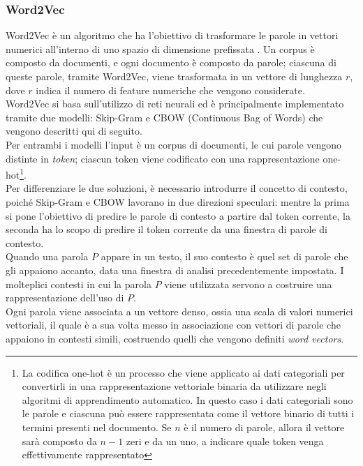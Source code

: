 \documentclass[12pt]{report}
\theoremstyle{definition}
\begin{document}
\subsubsection{Word2Vec} \label{w2v}
Word2Vec è un algoritmo che ha l'obiettivo di trasformare le parole in vettori numerici all'interno di uno spazio  di dimensione prefissata \cite{3}.
Un corpus è composto da documenti, e ogni documento è composto da parole; ciascuna di queste parole, tramite Word2Vec, viene trasformata in un vettore di lunghezza $r$, dove $r$ indica il numero di feature numeriche che vengono considerate. 
\\
Word2Vec si basa sull'utilizzo di reti neurali \cite{3} ed è principalmente implementato tramite due modelli: Skip-Gram e CBOW (Continuous Bag of Words) che vengono descritti qui di seguito.
\\
Per entrambi i modelli l'input è un corpus di documenti, le cui parole vengono distinte in \textit{token}; ciascun token viene codificato con una rappresentazione one-hot\footnote{La codifica one-hot è un processo che viene applicato ai dati categoriali per convertirli in una rappresentazione vettoriale binaria da utilizzare negli algoritmi di apprendimento automatico. In questo caso i dati categoriali sono le parole e ciascuna può essere rappresentata come il vettore binario di tutti i termini presenti nel documento. Se $n$ è il numero di parole, allora il vettore sarà composto da $n-1$ zeri e da un uno, a indicare quale token venga effettivamente rappresentato}.
\\
Per differenziare le due soluzioni, è necessario introdurre il concetto di contesto, poiché Skip-Gram e CBOW lavorano in due direzioni speculari:
mentre la prima si pone l'obiettivo di predire le parole di contesto a partire dal token corrente, la seconda ha lo scopo di predire il token corrente da una finestra di parole di contesto.
\\
Quando una parola $P$ appare in un testo, il suo contesto è quel set di parole che gli appaiono accanto, data una finestra di analisi precedentemente impostata. I molteplici contesti in cui la parola $P$ viene utilizzata servono a costruire una rappresentazione dell’uso di $P$.
\\
Ogni parola viene associata a un vettore denso, ossia una scala di valori numerici vettoriali, il quale è a sua volta messo in associazione con vettori di parole che appaiono in contesti simili, costruendo quelli che vengono definiti \textit{word vectors}.
\end{document}
